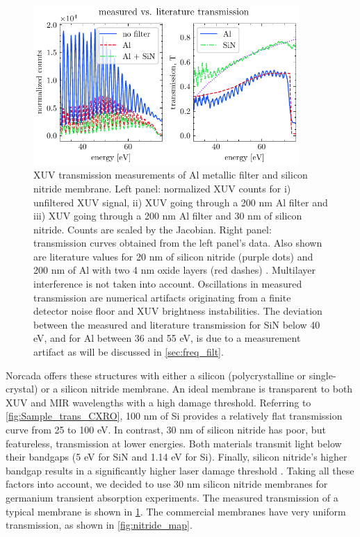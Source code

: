 \begin{figure}
	\centering
	\includegraphics[width=0.9\textwidth]{figures/chap4/SiN_Al_transmission.pdf}
	\caption{XUV transmission measurements of Al metallic filter and silicon nitride membrane. Left panel: normalized XUV counts for i) unfiltered XUV signal, ii) XUV going through a 200 nm Al filter and iii) XUV going through a 200 nm Al filter and 30 nm of silicon nitride. Counts are scaled by the Jacobian. Right panel: transmission curves obtained from the left panel's data. Also shown are literature values for 20 nm of silicon nitride (purple dots) and 200 nm of Al with two 4 nm oxide layers (red dashes) \cite{gulliksonCXROXRayInteractions}. Multilayer interference is not taken into account. Oscillations in measured transmission are numerical artifacts originating from a finite detector noise floor and XUV brightness instabilities. The deviation between the measured and literature transmission for SiN below 40 eV, and for Al between 36 and 55 eV, is due to a measurement artifact as will be discussed in \cref{sec:freq_filt}.}
	\label{fig:SiN_Al_transmission}
\end{figure}

Norcada offers these structures with either a silicon (polycrystalline or single-crystal) or a silicon nitride membrane. An ideal membrane is transparent to both XUV and MIR wavelengths with a high damage threshold. Referring to \cref{fig:Sample_trans_CXRO}, 100 nm of Si provides a relatively flat transmission curve from 25 to 100 eV. In contrast, 30 nm of silicon nitride has poor, but featureless, transmission at lower energies. Both materials transmit light below their bandgaps (5 eV for SiN and 1.14 eV for Si). Finally, silicon nitride's higher bandgap results in a significantly higher laser damage threshold \cite{gamalyAblationSolidsFemtosecond2002,austinFemtosecondLaserDamage2018,keldyshIonizationFieldStrong1965}. Taking all these factors into account, we decided to use 30 nm silicon nitride membranes for germanium transient absorption experiments. The measured transmission of a typical membrane is shown in \cref{fig:SiN_Al_transmission}. The commercial membranes have very uniform transmission, as shown in \cref{fig:nitride_map}.

